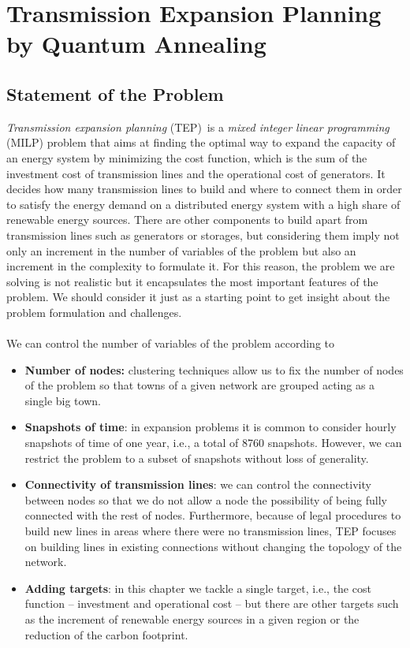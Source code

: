 \chapter{Transmission Expansion Planning by Quantum Annealing} %
\label{Chapter4} %
\section{Statement of the Problem}
\textit{Transmission expansion planning} (TEP)\,\cite{Neumann2020TransmissionFlows} is a \textit{mixed integer linear programming} (MILP) problem that aims at finding the optimal way to expand the capacity of an energy system by minimizing the cost function, which is the sum of the investment cost of transmission lines and the operational cost of generators. It decides how many transmission lines to build and where to connect them in order to satisfy the energy demand on a distributed energy system with a high share of renewable energy sources. There are other components to build apart from transmission lines such as generators or storages, but considering them imply not only an increment in the number of variables of the problem but also an increment in the complexity to formulate it. For this reason, the problem we are solving is not realistic but it encapsulates the most important features of the problem. We should consider it just as a starting point to get insight about the problem formulation and challenges.\\\\
We can control the number of variables of the problem according to
\begin{itemize}
    \item \textbf{Number of nodes:} clustering techniques allow us to fix the number of nodes of the problem so that towns of a given network are grouped acting as a single big town.
    \item \textbf{Snapshots of time}: in expansion problems it is common to consider hourly snapshots of time of one year, i.e., a total of 8760 snapshots. However, we can restrict the problem to a subset of snapshots without loss of generality.
    \item \textbf{Connectivity of transmission lines}: we can control the connectivity between nodes so that we do not allow a node the possibility of being fully connected with the rest of nodes. Furthermore, because of legal procedures to build new lines in areas where there were no transmission lines, TEP focuses on building lines in existing connections without changing the topology of the network.
    \item \textbf{Adding targets}: in this chapter we tackle a single target, i.e., the cost function -- investment and operational cost -- but there are other targets such as the increment of renewable energy sources in a given region or the reduction of the carbon footprint.
\end{itemize}
